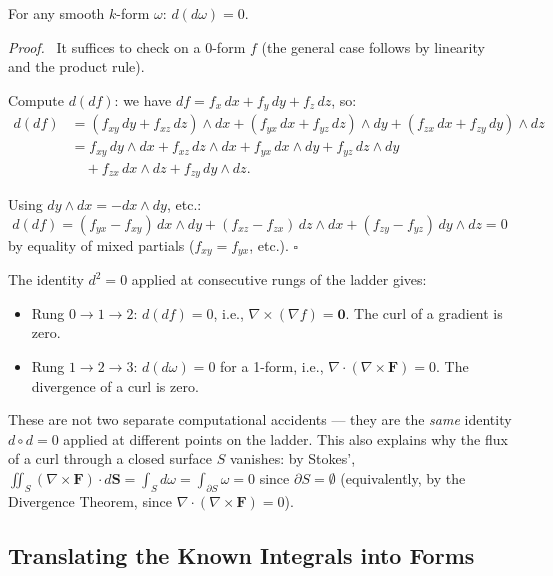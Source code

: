 \documentclass[11pt]{report}
\renewenvironment{proof}[1][Proof]{\par\noindent\textit{#1.}\ }{\hfill$\square$\par\medskip}
\begin{document}
\begin{theorem}[$d^2 = 0$]
For any smooth $k$-form $\omega$: $d(d\omega) = 0$.
\end{theorem}

\begin{proof}
It suffices to check on a 0-form $f$ (the general case follows by linearity and the product rule).

Compute $d(df)$: we have $df = f_x \, dx + f_y \, dy + f_z \, dz$, so:
\begin{align*}
d(df) &= (f_{xy} \, dy + f_{xz} \, dz) \wedge dx + (f_{yx} \, dx + f_{yz} \, dz) \wedge dy + (f_{zx} \, dx + f_{zy} \, dy) \wedge dz \\
&= f_{xy} \, dy \wedge dx + f_{xz} \, dz \wedge dx + f_{yx} \, dx \wedge dy + f_{yz} \, dz \wedge dy \\
&\quad + f_{zx} \, dx \wedge dz + f_{zy} \, dy \wedge dz.
\end{align*}

Using $dy \wedge dx = -dx \wedge dy$, etc.:
\[
d(df) = (f_{yx} - f_{xy}) \, dx \wedge dy + (f_{xz} - f_{zx}) \, dz \wedge dx + (f_{zy} - f_{yz}) \, dy \wedge dz = 0
\]
by equality of mixed partials ($f_{xy} = f_{yx}$, etc.).
\end{proof}

\begin{remark}[Classical Consequences of $d^2 = 0$]
The identity $d^2 = 0$ applied at consecutive rungs of the ladder gives:
\begin{itemize}
    \item Rung $0 \to 1 \to 2$: $d(df) = 0$, i.e., $\nabla \times (\nabla f) = \mathbf{0}$. The curl of a gradient is zero.
    \item Rung $1 \to 2 \to 3$: $d(d\omega) = 0$ for a 1-form, i.e., $\nabla \cdot (\nabla \times \mathbf{F}) = 0$. The divergence of a curl is zero.
\end{itemize}

These are not two separate computational accidents --- they are the \textit{same} identity $d \circ d = 0$ applied at different points on the ladder. This also explains why the flux of a curl through a closed surface $S$ vanishes: by Stokes', $\iint_S (\nabla \times \mathbf{F}) \cdot d\mathbf{S} = \int_S d\omega = \int_{\partial S} \omega = 0$ since $\partial S = \emptyset$ (equivalently, by the Divergence Theorem, since $\nabla \cdot (\nabla \times \mathbf{F}) = 0$).
\end{remark}

\subsection{Translating the Known Integrals into Forms}
\end{document}
